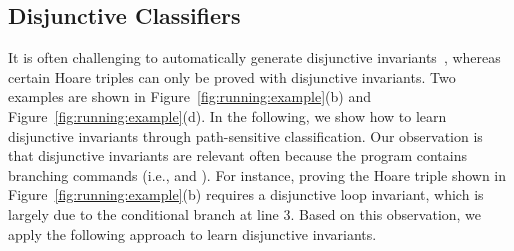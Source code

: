 \subsection{Disjunctive Classifiers} \label{disjunctive}
It is often challenging to automatically generate disjunctive invariants~\cite{DBLP:conf/cav/SharmaDDA11,DBLP:conf/pldi/GulwaniSV08}, whereas certain Hoare triples can only be proved with disjunctive invariants. Two examples are shown in Figure~\ref{fig:running:example}(b) and Figure~\ref{fig:running:example}(d). In the following, we show how to learn disjunctive invariants through path-sensitive classification. Our observation is that disjunctive invariants are relevant often because the program contains branching commands (i.e.,  and ). %
 For instance, proving the Hoare triple shown in Figure~\ref{fig:running:example}(b) requires a disjunctive loop invariant, which is largely due to the conditional branch at line 3. Based on this observation, we apply the following approach to learn disjunctive invariants.

